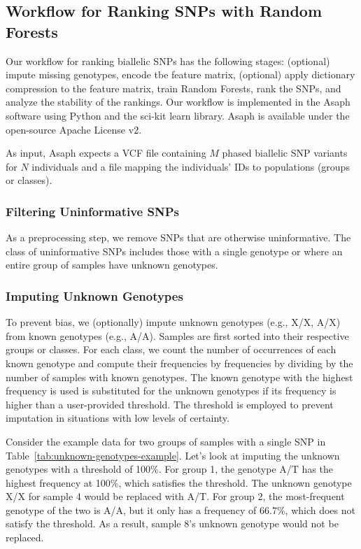 \subsection{Workflow for Ranking SNPs with Random Forests}
Our workflow for ranking biallelic SNPs has the following stages: (optional) impute missing genotypes, encode tbe feature matrix, (optional) apply dictionary compression to the feature matrix, train Random Forests, rank the SNPs, and analyze the stability of the rankings.  Our workflow is implemented in the Asaph software using Python and the sci-kit learn library.  Asaph is available under the open-source Apache License v2.

As input, Asaph expects a VCF file containing $M$ phased biallelic SNP variants for $N$ individuals and a file mapping the individuals' IDs to populations (groups or classes). 

\subsubsection{Filtering Uninformative SNPs}
As a preprocessing step, we remove SNPs that are otherwise uninformative.  The class of uninformative SNPs includes those with a single genotype or where an entire group of samples have unknown genotypes.

\subsubsection{Imputing Unknown Genotypes}
To prevent bias, we (optionally) impute unknown genotypes (e.g., X/X, A/X) from known genotypes (e.g., A/A).  Samples are first sorted into their respective groups or classes. For each class, we count the number of occurrences of each known genotype and compute their frequencies by frequencies by dividing by the number of samples with known genotypes.  The known genotype with the highest frequency is used is substituted for the unknown genotypes if its frequency is higher than a user-provided threshold.  The threshold is employed to prevent imputation in situations with low levels of certainty.

Consider the example data for two groups of samples with a single SNP in Table~\ref{tab:unknown-genotypes-example}.  Let's look at imputing the unknown genotypes with a threshold of 100\%. For group 1, the genotype A/T has the highest frequency at 100\%, which satisfies the threshold.  The unknown genotype X/X for sample 4 would be replaced with A/T.  For group 2, the most-frequent genotype of the two is A/A, but it only has a frequency of 66.7\%, which does not satisfy the threshold.  As a result, sample 8's unknown genotype would not be replaced.

